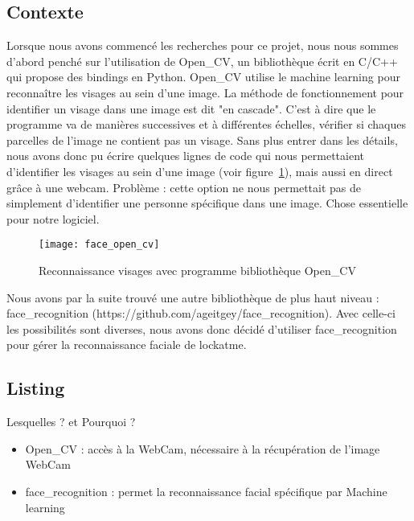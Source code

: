   \subsection{Contexte}
Lorsque nous avons commencé les recherches pour ce projet, nous nous sommes
d'abord penché sur l'utilisation de Open\_CV, un bibliothèque écrit en C/C++ qui
propose des bindings en Python. Open\_CV utilise le machine learning pour
reconnaître les visages au sein d'une image. La méthode de fonctionnement pour
identifier un visage dans une image est dit "en cascade". C'est à dire que le
programme va de manières successives et à différentes échelles, vérifier si
chaques parcelles de l'image ne contient pas un visage. Sans plus entrer dans
les détails, nous avons donc pu écrire quelques lignes de code qui nous
permettaient d'identifier les visages au sein d'une image (voir figure~\ref{fig:face}), mais aussi en direct
grâce à une webcam. Problème : cette option ne nous permettait pas de simplement
d'identifier une personne spécifique dans une image. Chose essentielle pour notre
logiciel.\\

\begin{figure}[h]
  \texttt{[image: face\_open\_cv]}
  \caption{Reconnaissance visages avec programme bibliothèque Open\_CV}
  \label{fig:face}
\end{figure}

\newpage

Nous avons par la suite trouvé une autre bibliothèque de plus haut niveau :
face\_recognition (https://github.com/ageitgey/face\_recognition). Avec celle-ci
les possibilités sont diverses, nous avons donc décidé d'utiliser face\_recognition
pour gérer la reconnaissance faciale de lockatme.

\subsection{Listing}
Lesquelles ? et Pourquoi ?
\\
  \begin{itemize}
    \item{Open\_CV : accès à la WebCam, nécessaire à la récupération de l'image
    WebCam}
    \item{face\_recognition : permet la reconnaissance facial spécifique par
    Machine learning}
  \end{itemize}

